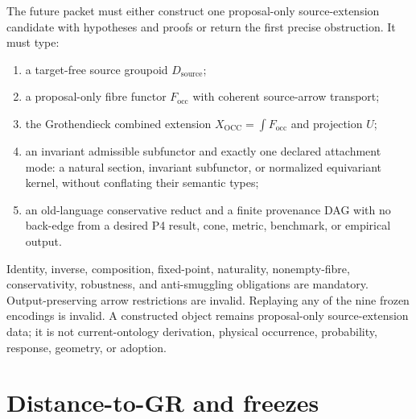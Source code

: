 \documentclass[11pt]{article}
\begin{document}
The future packet must either construct one proposal-only source-extension
candidate with hypotheses and proofs or return the first precise obstruction.
It must type:
\begin{enumerate}
  \item a target-free source groupoid $D_{\mathrm{source}}$;
  \item a proposal-only fibre functor $F_{\mathrm{occ}}$ with coherent
        source-arrow transport;
  \item the Grothendieck combined extension
        $X_{\mathrm{OCC}}=\int F_{\mathrm{occ}}$ and projection $U$;
  \item an invariant admissible subfunctor and exactly one declared attachment
        mode: a natural section, invariant subfunctor, or normalized equivariant
        kernel, without conflating their semantic types;
  \item an old-language conservative reduct and a finite provenance DAG with
        no back-edge from a desired P4 result, cone, metric, benchmark, or
        empirical output.
\end{enumerate}

Identity, inverse, composition, fixed-point, naturality, nonempty-fibre,
conservativity, robustness, and anti-smuggling obligations are mandatory.
Output-preserving arrow restrictions are invalid.  Replaying any of the nine
frozen encodings is invalid.  A constructed object remains proposal-only
source-extension data; it is not current-ontology derivation, physical
occurrence, probability, response, geometry, or adoption.

\section{Distance-to-GR and freezes}
\end{document}
